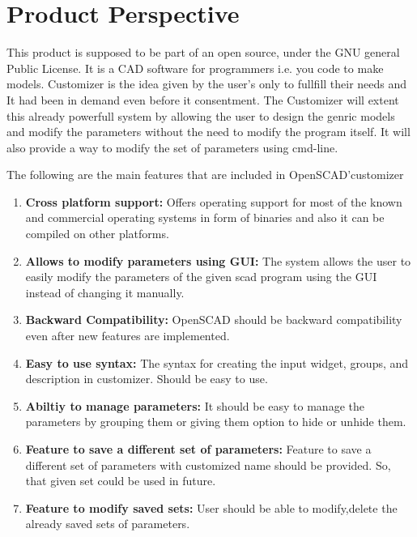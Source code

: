 \section{Product Perspective}
   
This product is supposed to be part of an open source, under the GNU general Public License. It is a CAD software for programmers i.e. you code to make models. Customizer is the idea given by the user's only to fullfill their needs and It had been in demand even before it consentment. The Customizer will extent this already powerfull system by allowing the user to design the genric models and modify the parameters without the need to modify the program itself. It will also provide a way to modify the set of parameters using cmd-line.
   
The following are the main features that are included in OpenSCAD'customizer

\begin{enumerate}
    \item \textbf{Cross platform support:} Offers operating support for most of the known and commercial operating systems in form of binaries and also it can be compiled on other platforms.
   
    \item \textbf{Allows to modify parameters using GUI:} The system allows the user to easily modify the parameters of the given scad program using the GUI instead of changing it
    manually.
   
    \item \textbf{Backward Compatibility:} OpenSCAD should be backward compatibility even after new features are implemented.
   
    \item \textbf{Easy to use syntax:} The syntax for creating the input widget, groups, and description in customizer. Should be easy to use.
   
    \item \textbf{Abiltiy to manage parameters:} It should be easy to manage the parameters by grouping them or giving them option to hide or unhide them.
   
    \item \textbf{Feature to save a different set of parameters:} Feature to save a different set of parameters with customized name should be provided. So, that given set could be used in future.
   
    \item \textbf{Feature to modify saved sets:} User should be able to modify,delete the already saved sets of parameters.
   
\end{enumerate}  
